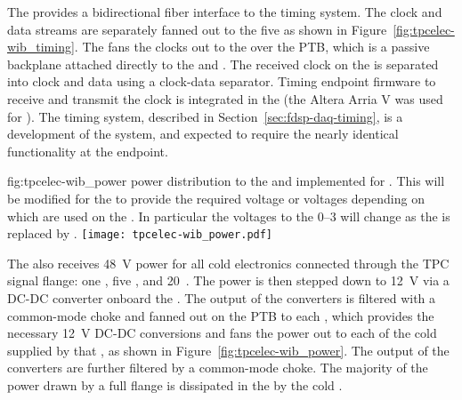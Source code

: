 The   provides a bidirectional fiber interface to the
timing system. The clock and data
streams are separately fanned out to the five  as shown in
Figure~\ref{fig:tpcelec-wib_timing}. The  fans the clocks out to the  over the
PTB, which is a passive backplane attached directly to the  and
.  The received clock on the  is separated into clock and
data using a clock-data separator. Timing endpoint firmware to receive and transmit
the clock is integrated in the   (the Altera Arria V was used for ).
The  timing system, described in Section~\ref{sec:fdsp-daq-timing}, is a development of the  system, and expected to require the nearly identical functionality at the  endpoint.

\begin{dunefigure}
{fig:tpcelec-wib_power}
{ power distribution to the  and  implemented for . This will be modified for the  to provide the required voltage or voltages depending on which  are used on the . In particular the voltages to the  \numrange{0}{3} will change as the   is replaced by . }
\texttt{[image: tpcelec-wib\_power.pdf]}
\end{dunefigure}

The  also receives \SI{48}{V}  power for all cold
electronics connected through the TPC signal flange: one , five , and \num{20}~. The  power is then stepped down
to \SI{12}{V} via a DC-DC converter onboard the . The output of the  converters is filtered with a common-mode choke and fanned out
on the PTB to each , which provides the necessary \SI{12}{V} DC-DC conversions and fans
the  power out to each of the cold  supplied by that , 
as shown in Figure~\ref{fig:tpcelec-wib_power}. The output of the  converters are further filtered by a common-mode choke. The 
majority of the power drawn by a full flange is dissipated in the \lar by the cold .


